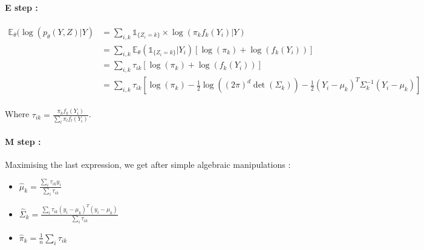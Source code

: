 \documentclass[a4paper,10pt]{article}
\begin{document}
\paragraph{E step :}



\begin{align*}
\mathds{E}_\theta (\log(p_\theta(Y,Z)|Y) &= \sum_{i,k} \mathds{1}_{\{Z_i = k\}} \times \log(\pi_k f_k(Y_i)|Y)\\
&= \sum_{i,k} \mathds{E}_\theta \left( \mathds{1}_{\{Z_i = k\}} |Y_i\right)[\log(\pi_k) + \log(f_k(Y_i)) ]\\
&= \sum_{i,k}\tau_{ik}[\log(\pi_k) + \log(f_k(Y_i)) ] \\
&= \sum_{i,k}\tau_{ik}\left[\log(\pi_k)-\frac{1}{2}\log\left((2\pi)^d\det(\Sigma_k)\right) - \frac{1}{2}(Y_i - \mu_k)^T\Sigma_k^{-1}(Y_i - \mu_k)\right] \\
\end{align*}

Where $\tau_{ik} = \frac{\pi_k f_k(Y_i)}{\sum_{l} \pi_l f_l(Y_i)}$.
\paragraph{M step :}
Maximising the last expression, we get after simple algebraic manipulations :
\begin{itemize}
\item \large{$\hat{\mu}_k = \frac{\sum_i \tau_{ik} y_i}{\sum_i \tau_{ik}}$}\normalsize
\item \large{$\hat{\Sigma}_k = \frac{\sum_i \tau_{ik} (y_i-\mu_k)^T(y_i-\mu_k)}{\sum_i \tau_{ik}}$}\normalsize
\item \large{$\hat{\pi}_k = \frac{1}{n} \sum_i \tau_{ik}$}
\end{itemize}
\end{document}
